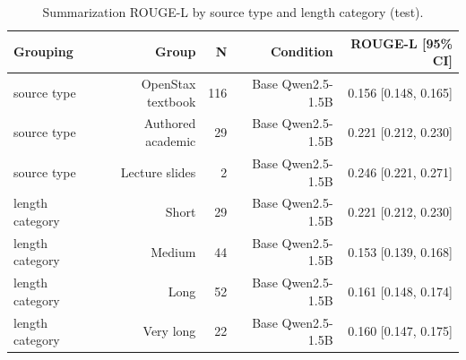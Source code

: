 \begin{table}[t]
\centering
\caption{Summarization ROUGE-L by source type and length category (test).}
\label{tab:t5_summarization_breakdown}
\begin{tabular}{lrrrr}
\toprule
Grouping & Group & N & Condition & ROUGE-L [95\% CI] \\
\midrule
source type & OpenStax textbook & 116 & Base Qwen2.5-1.5B & 0.156 [0.148, 0.165] \\
source type & Authored academic & 29 & Base Qwen2.5-1.5B & 0.221 [0.212, 0.230] \\
source type & Lecture slides & 2 & Base Qwen2.5-1.5B & 0.246 [0.221, 0.271] \\
length category & Short & 29 & Base Qwen2.5-1.5B & 0.221 [0.212, 0.230] \\
length category & Medium & 44 & Base Qwen2.5-1.5B & 0.153 [0.139, 0.168] \\
length category & Long & 52 & Base Qwen2.5-1.5B & 0.161 [0.148, 0.174] \\
length category & Very long & 22 & Base Qwen2.5-1.5B & 0.160 [0.147, 0.175] \\
\bottomrule
\end{tabular}
\end{table}
